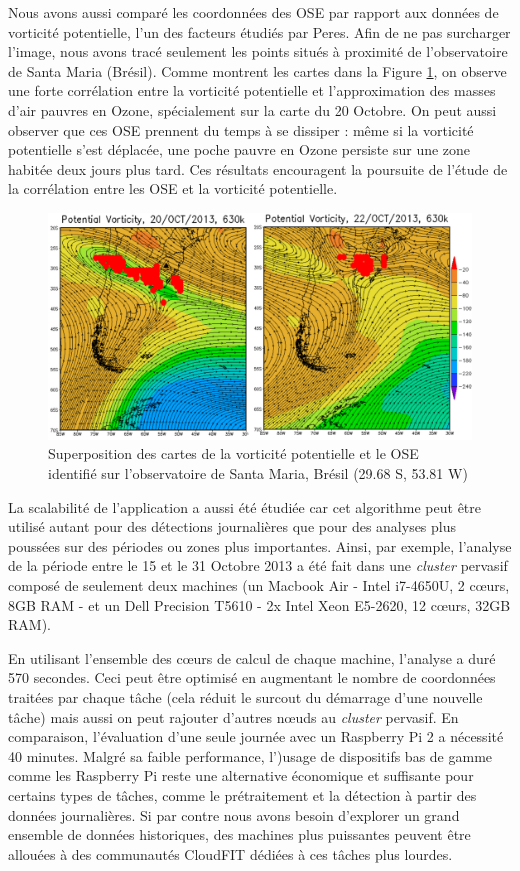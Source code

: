 Nous avons aussi comparé les coordonnées des OSE par rapport aux données de vorticité potentielle, l'un des facteurs étudiés par Peres. Afin de ne pas surcharger l'image, nous avons tracé seulement les points situés à proximité de l'observatoire de Santa Maria (Brésil). Comme montrent les cartes dans la Figure \ref{fig:comparison}, on observe une forte corrélation entre la vorticité potentielle et l'approximation des masses d'air pauvres en Ozone, spécialement sur la carte du 20 Octobre.  On peut aussi observer que ces OSE prennent du temps à se dissiper : même si la vorticité potentielle s'est déplacée, une poche pauvre en Ozone persiste sur une zone habitée deux jours plus tard. Ces résultats encouragent la poursuite de l'étude de la corrélation entre les OSE et la vorticité potentielle.


\begin{figure}
	\centering
	\includegraphics[width=0.75\linewidth]{img/comparison2}
	\caption{Superposition des cartes de la vorticité potentielle et le OSE identifié sur l'observatoire de Santa Maria, Brésil (29.68 S, 53.81 W)}\label{fig:comparison}
\end{figure}

La scalabilité de l'application a aussi été étudiée car cet algorithme peut être utilisé autant pour des détections journalières que pour des analyses plus poussées sur des périodes ou zones plus importantes. Ainsi, par exemple, l'analyse de la période entre le 15 et le 31 Octobre 2013 a été fait dans une \textit{cluster} pervasif composé de seulement deux machines (un Macbook Air  - Intel i7-4650U, 2 c{\oe}urs, 8GB RAM -  et un Dell Precision T5610 - 2x Intel Xeon E5-2620, 12 c{\oe}urs, 32GB RAM). 

En utilisant l'ensemble des c{\oe}urs de calcul de chaque machine, l'analyse a duré 570 secondes. Ceci peut être optimisé en augmentant le nombre de coordonnées traitées par chaque tâche (cela réduit le surcout du démarrage d'une nouvelle tâche) mais aussi on peut rajouter d'autres n{\oe}uds au \textit{cluster} pervasif. En comparaison, l'évaluation d'une seule journée avec un Raspberry Pi 2 a nécessité 40 minutes. Malgré sa faible performance, l')usage de dispositifs bas de gamme comme les Raspberry Pi reste une alternative économique et suffisante pour certains types de tâches, comme le prétraitement et la détection à partir des données journalières. Si par contre nous avons besoin d'explorer un grand ensemble de données historiques, des machines plus puissantes peuvent être allouées à des communautés CloudFIT dédiées à ces tâches plus lourdes. 

